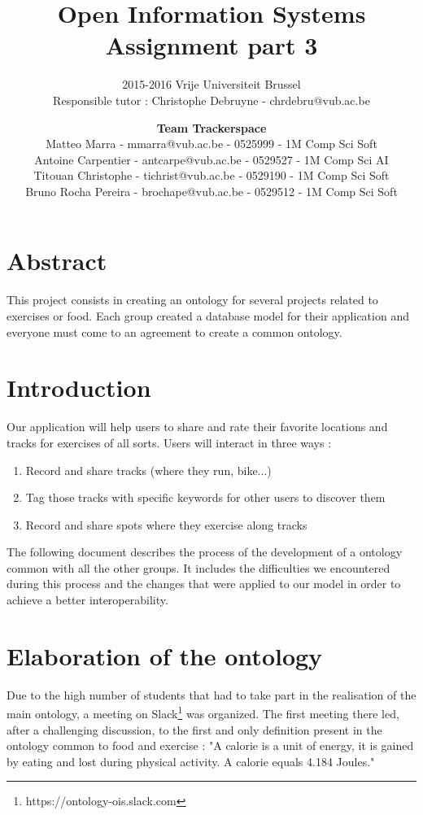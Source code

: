 \documentclass[a4paper]{article}
\title{\textbf{Open Information Systems\\Assignment part 3}}
\subtitle{2015-2016 Vrije Universiteit Brussel\\Responsible tutor : Christophe Debruyne - chrdebru@vub.ac.be}
\author{\textbf{Team Trackerspace}\\Matteo Marra - mmarra@vub.ac.be - 0525999 - 1M Comp Sci Soft\\Antoine Carpentier - antcarpe@vub.ac.be - 0529527 - 1M Comp Sci AI\\Titouan Christophe - tichrist@vub.ac.be - 0529190 - 1M Comp Sci Soft\\Bruno Rocha Pereira - brochape@vub.ac.be - 0529512 - 1M Comp Sci Soft}
\begin{document}
\maketitle

\section{Abstract}
This project consists in creating an ontology for several projects related to exercises or food. Each group created a database model for their application and everyone must come to an agreement to create a common ontology.

\section{Introduction}

Our application will help users to share and rate their favorite locations and tracks for exercises of all sorts. Users will interact in three ways : 

\begin{enumerate}
    \item Record and share tracks (where they run, bike...)
    \item Tag those tracks with specific keywords for other users to discover them
    \item Record and share spots where they exercise along tracks
\end{enumerate}

The following document describes the process of the development of a ontology common with all the other groups. It includes the difficulties we encountered during this process and the changes that were applied to our model in order to achieve a better interoperability.




\section{Elaboration of the ontology}
Due to the high number of students that had to take part in the realisation of the main ontology, a meeting on Slack\footnote{https://ontology-ois.slack.com} was organized. The first meeting there led, after a challenging discussion, to the first and only definition present in the ontology common to food and exercise : "A calorie is a unit of energy, it is gained by eating and lost during physical activity. A calorie equals 4.184 Joules." 
\end{document}
